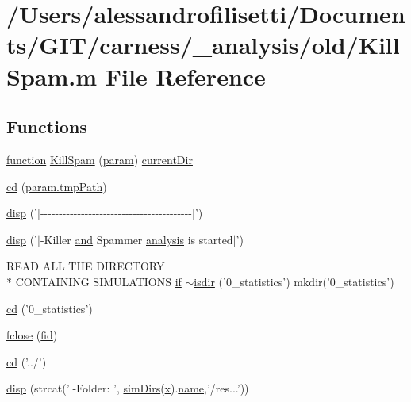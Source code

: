 \hypertarget{a00029}{\section{/\-Users/alessandrofilisetti/\-Documents/\-G\-I\-T/carness/\-\_\-analysis/old/\-Kill\-Spam.m File Reference}
\label{a00029}
}
\subsection*{Functions}
\begin{DoxyCompactItemize}
\item 
\hyperlink{a00068_a4b4c670b101bf7a838f775e008fa6255}{function} \hyperlink{a00029_acfbe15da69f5cf2e58667e2b19b500e7}{Kill\-Spam} (\hyperlink{a00033_a51f20d6b1b54a2eee3be0e8adc96a0ae}{param}) \hyperlink{a00031_af32eb97339f1e9d37b5540de2cbc79c9}{current\-Dir}
\item 
\hyperlink{a00029_a60547755325ad4e7a25c614f83776ee7}{cd} (\hyperlink{a00032_a1e5a4863ab2b87f923e1d19e2da1f5ac}{param.\-tmp\-Path})
\item 
\hyperlink{a00029_a3015506d09b4ef94312c10ce85f4c3ad}{disp} ('$|$-\/-\/-\/-\/-\/-\/-\/-\/-\/-\/-\/-\/-\/-\/-\/-\/-\/-\/-\/-\/-\/-\/-\/-\/-\/-\/-\/-\/-\/-\/-\/-\/-\/-\/-\/-\/-\/-\/-\/-\/-\/$|$')
\item 
\hyperlink{a00029_a16c8f16b559b22e1f31c9e00f75fe520}{disp} ('$|$-\/Killer \hyperlink{a00028_a170f8acb213f91bf71c77b1d20bceb33}{and} Spammer \hyperlink{a00032_abf6e5638a23a2531114655f3f690b70c}{analysis} is started$|$')
\item 
R\-E\-A\-D A\-L\-L T\-H\-E D\-I\-R\-E\-C\-T\-O\-R\-Y \\*
C\-O\-N\-T\-A\-I\-N\-I\-N\-G S\-I\-M\-U\-L\-A\-T\-I\-O\-N\-S \hyperlink{a00030_a01d55766b8058903dd360b4bda71f9f5}{if} \hyperlink{a00029_aef429e9a25e0d4d70aa2037a59816956}{$\sim$isdir} ('0\-\_\-statistics') mkdir('0\-\_\-statistics')
\item 
\hyperlink{a00029_a365d011aeb5adcedc5cc75e7df629a6f}{cd} ('0\-\_\-statistics')
\item 
\hyperlink{a00029_a5e769bbbabcaddc548203741c7100228}{fclose} (\hyperlink{a00031_ae9011d40c6f13e68e6f07156e0da7c5d}{fid})
\item 
\hyperlink{a00029_a7eb00a69197e8905221801683c7ec02a}{cd} ('../')
\item 
\hyperlink{a00029_a609f02c862f2843febf3408f688be8e8}{disp} (strcat('$|$-\/Folder\-: ', \hyperlink{a00031_aae5035eb84b89176ed5b06e136325eff}{sim\-Dirs}(\hyperlink{a00031_a7265972fe485274cfff77a9bb07b8fce}{x}).\hyperlink{a00027_abbf559a76fab59203496b0847ab9502a}{name},'/res...'))

\end{DoxyCompactItemize}
